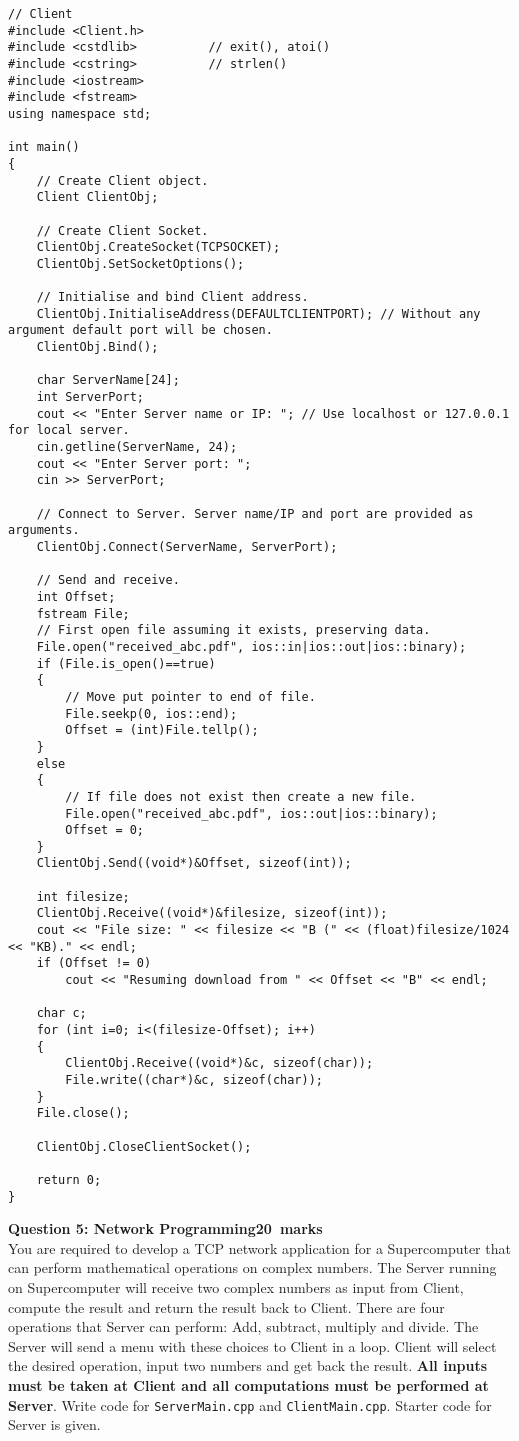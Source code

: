 \documentclass[12pt,a4paper]{article}
\def\Qfive{20}
\begin{document}
\begin{lstlisting}
// Client
#include <Client.h>
#include <cstdlib>			// exit(), atoi()
#include <cstring>			// strlen()
#include <iostream>
#include <fstream>
using namespace std;

int main()
{
	// Create Client object.
	Client ClientObj;

	// Create Client Socket.
	ClientObj.CreateSocket(TCPSOCKET);
	ClientObj.SetSocketOptions();

	// Initialise and bind Client address.
	ClientObj.InitialiseAddress(DEFAULTCLIENTPORT);	// Without any argument default port will be chosen.
	ClientObj.Bind();

	char ServerName[24];
	int ServerPort;
	cout << "Enter Server name or IP: "; // Use localhost or 127.0.0.1 for local server.
	cin.getline(ServerName, 24);
	cout << "Enter Server port: ";
	cin >> ServerPort;

	// Connect to Server. Server name/IP and port are provided as arguments.
	ClientObj.Connect(ServerName, ServerPort);

	// Send and receive.
	int Offset;
	fstream File;
	// First open file assuming it exists, preserving data.
	File.open("received_abc.pdf", ios::in|ios::out|ios::binary);
	if (File.is_open()==true)
	{
		// Move put pointer to end of file.
		File.seekp(0, ios::end);
		Offset = (int)File.tellp();
	}
	else
	{
		// If file does not exist then create a new file.
		File.open("received_abc.pdf", ios::out|ios::binary);
		Offset = 0;
	}
	ClientObj.Send((void*)&Offset, sizeof(int));

	int filesize;
	ClientObj.Receive((void*)&filesize, sizeof(int));
	cout << "File size: " << filesize << "B (" << (float)filesize/1024 << "KB)." << endl;
	if (Offset != 0)
		cout << "Resuming download from " << Offset << "B" << endl;

	char c;
	for (int i=0; i<(filesize-Offset); i++)
	{
		ClientObj.Receive((void*)&c, sizeof(char));
		File.write((char*)&c, sizeof(char));
	}
	File.close();

	ClientObj.CloseClientSocket();

	return 0;
}
\end{lstlisting}
\newpage
\noindent\textbf{Question 5: Network Programming\hfill \Qfive~marks}\\
You are required to develop a TCP network application for a Supercomputer that can perform mathematical operations on complex numbers. The Server running on Supercomputer will receive two complex numbers as input from Client, compute the result and return the result back to Client. There are four operations that Server can perform: Add, subtract, multiply and divide. The Server will send a menu with these choices to Client in a loop. Client will select the desired operation, input two numbers and get back the result. \textbf{All inputs must be taken at Client and all computations must be performed at Server}. Write code for \verb|ServerMain.cpp| and \verb|ClientMain.cpp|. Starter code for Server is given.
\end{document}
